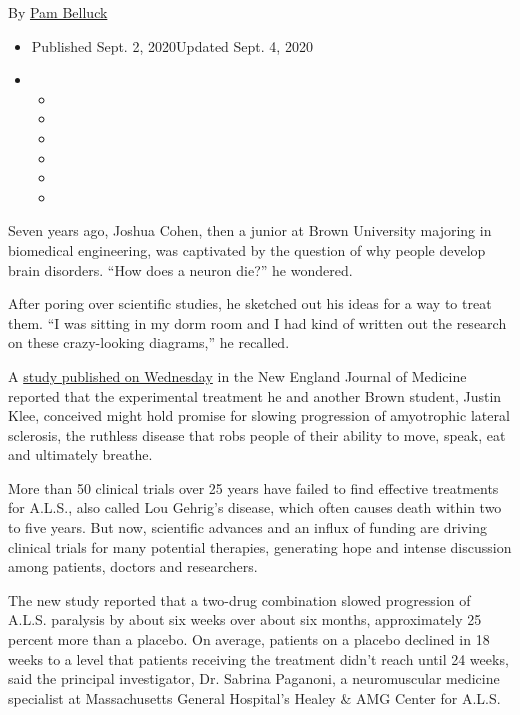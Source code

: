 By \href{https://www.nytimes3xbfgragh.onion/by/pam-belluck}{Pam Belluck}

\begin{itemize}
\item
  Published Sept. 2, 2020Updated Sept. 4, 2020
\item
  \begin{itemize}
  \item
  \item
  \item
  \item
  \item
  \item
  \end{itemize}
\end{itemize}

Seven years ago, Joshua Cohen, then a junior at Brown University
majoring in biomedical engineering, was captivated by the question of
why people develop brain disorders. ``How does a neuron die?'' he
wondered.

After poring over scientific studies, he sketched out his ideas for a
way to treat them. ``I was sitting in my dorm room and I had kind of
written out the research on these crazy-looking diagrams,'' he recalled.

A \href{http://www.nejm.org/doi/full/10.1056/NEJMoa1916945}{study
published on Wednesday} in the New England Journal of Medicine reported
that the experimental treatment he and another Brown student, Justin
Klee, conceived might hold promise for slowing progression of
amyotrophic lateral sclerosis, the ruthless disease that robs people of
their ability to move, speak, eat and ultimately breathe.

More than 50 clinical trials over 25 years have failed to find effective
treatments for A.L.S., also called Lou Gehrig's disease, which often
causes death within two to five years. But now, scientific advances and
an influx of funding are driving clinical trials for many potential
therapies, generating hope and intense discussion among patients,
doctors and researchers.

The new study reported that a two-drug combination slowed progression of
A.L.S. paralysis by about six weeks over about six months, approximately
25 percent more than a placebo. On average, patients on a placebo
declined in 18 weeks to a level that patients receiving the treatment
didn't reach until 24 weeks, said the principal investigator, Dr.
Sabrina Paganoni, a neuromuscular medicine specialist at Massachusetts
General Hospital's Healey \& AMG Center for A.L.S.

